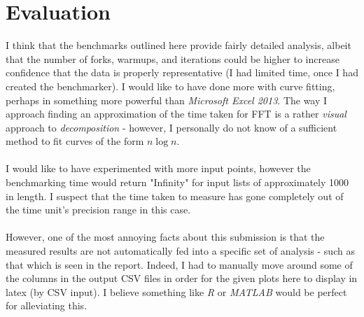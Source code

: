 \documentclass[]{article}
\begin{document}
\section{Evaluation}
I think that the benchmarks outlined here provide fairly detailed analysis, albeit that the number of forks, warmups, and iterations could be higher to increase confidence that the data is properly representative (I had limited time, once I had created the benchmarker). I would like to have done more with curve fitting, perhaps in something more powerful than \emph{Microsoft Excel 2013}. The way I approach finding an approximation of the time taken for FFT is a rather \emph{visual} approach to \emph{decomposition} - however, I personally do not know of a sufficient method to fit curves of the form $n\log{n}$.
\\\\
I would like to have experimented with more input points, however the benchmarking time would return "Infinity" for input lists of approximately 1000 in length. I suspect that the time taken to measure has gone completely out of the time unit's precision range in this case.
\\\\
However, one of the most annoying facts about this submission is that the measured results are not automatically fed into a specific set of analysis - such as that which is seen in the report. Indeed, I had to manually move around some of the columns in the output CSV files in order for the given plots here to display in latex (by CSV input). I believe something like \emph{R} or \emph{MATLAB} would be perfect for alleviating this.


\end{document}
